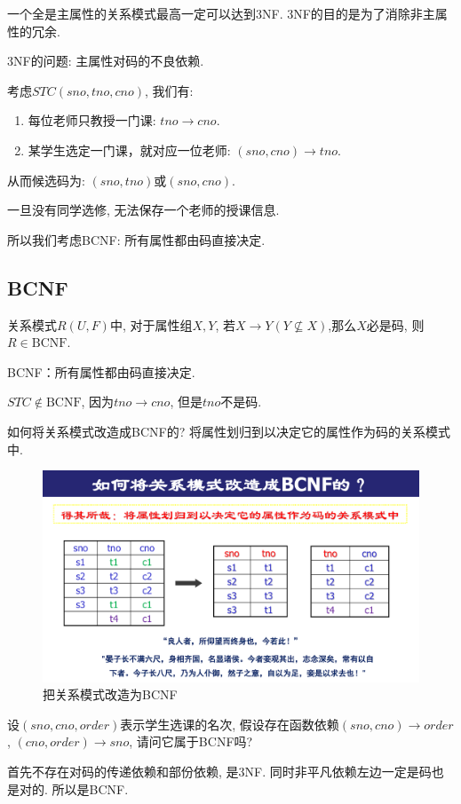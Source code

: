 \begin{remark}
  一个全是主属性的关系模式最高一定可以达到3NF. 3NF的目的是为了消除非主属性的冗余.
\end{remark}

3NF的问题: 主属性对码的不良依赖.

\begin{example}
  考虑$STC(sno,tno,cno)$, 我们有:
  \begin{enumerate}
      \item 每位老师只教授一门课: $tno \to cno$.
      \item 某学生选定一门课，就对应一位老师: $(sno,cno)\to tno$.
  \end{enumerate}

  从而候选码为: $(sno, tno)$或$(sno,cno)$. 
  
  一旦没有同学选修, 无法保存一个老师的授课信息.
\end{example}

所以我们考虑BCNF: 所有属性都由码直接决定.

\subsection{BCNF}

\begin{definition}[BCNF]
  关系模式$R(U,F)$中, 对于属性组$X,Y$, 若$X\to Y(Y\nsubseteq X)$,那么$X$必是码, 则$R\in\text{BCNF}$.
\end{definition}

BCNF：所有属性都由码直接决定.

$STC\notin \text{BCNF}$, 因为$tno\to cno$, 但是$tno$不是码.

如何将关系模式改造成BCNF的? 将属性划归到以决定它的属性作为码的关系模式中.

\begin{figure}[H]
    \centering
    \includegraphics[width=.6\textwidth]{./figure/BCNF.pdf}
    \caption{把关系模式改造为BCNF}
\end{figure}


\begin{example}
  设$(sno,cno,order)$表示学生选课的名次, 假设存在函数依赖$(sno,cno)\to order$, $(cno,order)\to sno$, 请问它属于BCNF吗?

  首先不存在对码的传递依赖和部份依赖, 是3NF. 同时非平凡依赖左边一定是码也是对的. 所以是BCNF.
\end{example}

